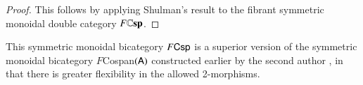 \documentclass[reqno]{amsart}
\begin{document}
\begin{proof}
This follows by applying Shulman's result \cite[Thm.\ 1.2]{Shulman2010} to the fibrant symmetric monoidal double category $F\mathbf{\mathbb Csp}$.
\end{proof}

This symmetric monoidal bicategory $F\mathsf{Csp}$ is a superior version of the symmetric monoidal bicategory $F$Cospan$(\mathsf{A})$ constructed earlier by the second author \cite{Courser}, in that there is greater flexibility in the allowed 2-morphisms.

\end{document}
